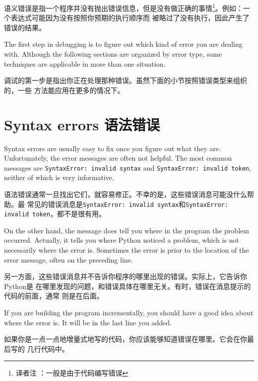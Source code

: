 \documentclass[10pt]{book}
\begin{document}
\begin{CJK}{UTF8}{gbsn}
\begin{itemize}
  语义错误是指一个程序并没有抛出错误信息，但是没有做正确的事情\footnote{译者注
  ：一般是由于代码编写错误}。例如：一个表达式可能因为没有按照你预期的执行顺序而
  被略过了没有执行，因此产生了错误的结果。

\end{itemize}

The first step in debugging is to figure out which kind of
error you are dealing with.  Although the following sections are
organized by error type, some techniques are
applicable in more than one situation.

调试的第一步是指出你正在处理那种错误。虽然下面的小节按照错误类型来组织的，一些
方法能应用在更多的情况下。

\section{Syntax errors 语法错误}

Syntax errors are usually easy to fix once you figure out what they
are.  Unfortunately, the error messages are often not helpful.
The most common messages are {\tt SyntaxError: invalid syntax} and
{\tt SyntaxError: invalid token}, neither of which is very informative.

语法错误通常一旦找出它们，就容易修正。不幸的是，这些错误消息可能没什么帮助。最
常见的错误消息是{\tt SyntaxError: invalid syntax}和{\tt SyntaxError: invalid
token}，都不是很有用。

On the other hand, the message does tell you where in the program the
problem occurred.  Actually, it tells you where Python
noticed a problem, which is not necessarily where the error
is.  Sometimes the error is prior to the location of the error
message, often on the preceding line.

另一方面，这些错误消息并不告诉你程序的哪里出现的错误。实际上，它告诉你Python是
在哪里发现的问题，和错误具体在哪里无关。有时，错误在消息提示的代码的前面，通常
则是在后面。

If you are building the program incrementally, you should have
a good idea about where the error is.  It will be in the last
line you added.

如果你是一点一点地增量式地写的代码，你应该能够知道错误在哪里。它会在你最后写的
几行代码中。


\end{CJK}
\end{document}
